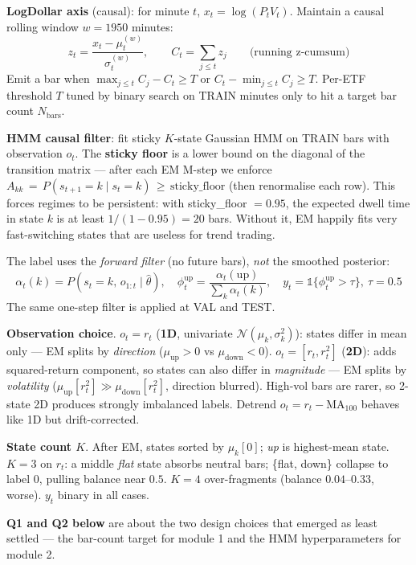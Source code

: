 \documentclass[11pt]{article}
\begin{document}
\smallskip
\textbf{LogDollar axis} (causal): for minute $t$, $x_t = \log(P_t V_t)$. Maintain a causal rolling window $w{=}1950$ minutes:
\[ z_t = \frac{x_t - \mu_t^{(w)}}{\sigma_t^{(w)}}, \qquad C_t = \sum_{j \le t} z_j \qquad\text{(running z-cumsum)} \]
Emit a bar when $\max_{j \le t} C_j - C_t \ge T$ or $C_t - \min_{j \le t} C_j \ge T$. Per-ETF threshold $T$ tuned by binary search on TRAIN minutes only to hit a target bar count $N_{\mathrm{bars}}$.

\smallskip
\textbf{HMM causal filter}: fit sticky $K$-state Gaussian HMM on TRAIN bars with observation $o_t$. The \textbf{sticky floor} is a lower bound on the diagonal of the transition matrix --- after each EM M-step we enforce
$A_{kk} \,=\, P(s_{t+1}{=}k\mid s_t{=}k) \,\ge\, \mathrm{sticky\_floor}$ (then renormalise each row).
This forces regimes to be persistent: with sticky\_floor $=0.95$, the expected dwell time in state $k$ is at least $1/(1-0.95)=20$ bars. Without it, EM happily fits very fast-switching states that are useless for trend trading.

The label uses the \emph{forward filter} (no future bars), \emph{not} the smoothed posterior:
\[ \alpha_t(k) = P(s_t{=}k,\,o_{1:t}\mid\hat\theta), \quad
   \phi_t^{\mathrm{up}} = \frac{\alpha_t(\mathrm{up})}{\sum_k \alpha_t(k)}, \quad
   y_t = \mathbb{1}\{\phi_t^{\mathrm{up}} > \tau\},\ \tau{=}0.5 \]
The same one-step filter is applied at VAL and TEST.

\smallskip
\textbf{Observation choice}. $o_t = r_t$ (\textbf{1D}, univariate $\mathcal{N}(\mu_k, \sigma_k^2)$): states differ in mean only --- EM splits by \textit{direction} ($\mu_{\mathrm{up}}{>}0$ vs $\mu_{\mathrm{down}}{<}0$). $o_t = [r_t, r_t^2]$ (\textbf{2D}): adds squared-return component, so states can also differ in \emph{magnitude} --- EM splits by \emph{volatility} ($\mu_{\mathrm{up}}[r_t^2]\gg\mu_{\mathrm{down}}[r_t^2]$, direction blurred). High-vol bars are rarer, so 2-state 2D produces strongly imbalanced labels. Detrend $o_t = r_t-\mathrm{MA}_{100}$ behaves like 1D but drift-corrected.

\smallskip
\textbf{State count $K$}. After EM, states sorted by $\mu_k[0]$; \textit{up} is highest-mean state. $K{=}3$ on $r_t$: a middle \textit{flat} state absorbs neutral bars; \{flat, down\} collapse to label $0$, pulling balance near $0.5$. $K{=}4$ over-fragments (balance $0.04$--$0.33$, worse). $y_t$ binary in all cases.

\textbf{Q1 and Q2 below} are about the two design choices that emerged as least settled --- the bar-count target for module 1 and the HMM hyperparameters for module 2.
\end{document}
